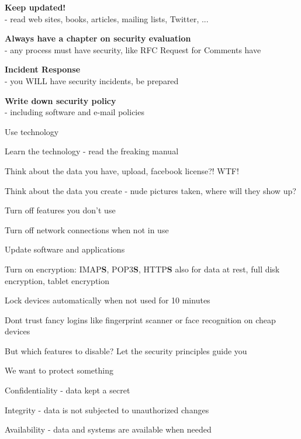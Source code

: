 \documentclass[Screen16to9,17pt]{foils}
\begin{document}

\begin{list1}
\item {\bf Keep updated!}\\ - read web sites, books, articles, mailing lists, Twitter, ...
\item {\bf Always have a chapter on security evaluation }\\ - any process must have security, like RFC Request for Comments have
\item {\bf Incident Response}\\ - you WILL have security incidents, be prepared
\item {\bf Write down security policy}\\ - including software and e-mail policies
\end{list1}



\begin{list1}
\item Use technology
\item Learn the technology - read the freaking manual
\item Think about the data you have, upload, facebook license?! WTF!
\item Think about the data you create - nude pictures taken, where will they show up?
\begin{list2}
\item Turn off features you don't use
\item Turn off network connections when not in use
\item Update software and applications
\item Turn on encryption: IMAP{\bf S}, POP3{\bf S},
  HTTP{\bf S} also for data at rest, full disk encryption, tablet encryption
\item Lock devices automatically when not used for 10 minutes
\item Dont trust fancy logins like fingerprint scanner or face recognition on cheap devices
\end{list2}
\end{list1}

But which features to disable? Let the security principles guide you



\begin{list1}
\item We want to protect something
\item Confidentiality - data kept a secret
\item Integrity - data is not subjected to unauthorized changes
\item Availability - data and systems are available when needed
\end{list1}
\end{document}
